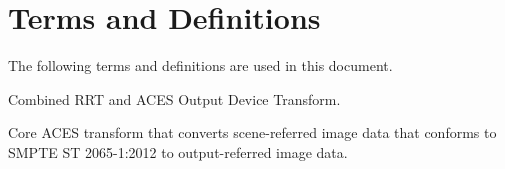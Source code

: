 \numberedformat
\chapter{Terms and Definitions}
The following terms and definitions are used in this document.

Combined RRT and ACES Output Device Transform.

Core ACES transform that converts scene-referred image data that conforms to SMPTE ST 2065-1:2012 to output-referred image data.